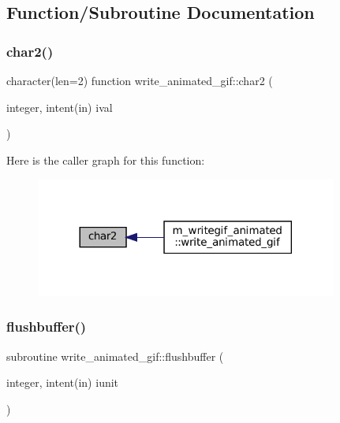 \subsection{Function/\+Subroutine Documentation}
\mbox{\label{M__writegif__animated_8f90_a795066c06f318c8d4ba41430b6826567}} 
\subsubsection{\texorpdfstring{char2()}{char2()}}
{\footnotesize\ttfamily character(len=2) function write\+\_\+animated\+\_\+gif\+::char2 (\begin{DoxyParamCaption}\item[{integer, intent(in)}]{ival }\end{DoxyParamCaption})\hspace{0.3cm}{\ttfamily [private]}}

Here is the caller graph for this function\+:\nopagebreak
\begin{figure}[H]
\begin{center}
\leavevmode
\includegraphics[width=281pt]{M__writegif__animated_8f90_a795066c06f318c8d4ba41430b6826567_icgraph}
\end{center}
\end{figure}
\mbox{\label{M__writegif__animated_8f90_a83cb0569b0e010d8ad27afd1b4cd945e}} 
\subsubsection{\texorpdfstring{flushbuffer()}{flushbuffer()}}
{\footnotesize\ttfamily subroutine write\+\_\+animated\+\_\+gif\+::flushbuffer (\begin{DoxyParamCaption}\item[{integer, intent(in)}]{iunit }\end{DoxyParamCaption})\hspace{0.3cm}{\ttfamily [private]}}

